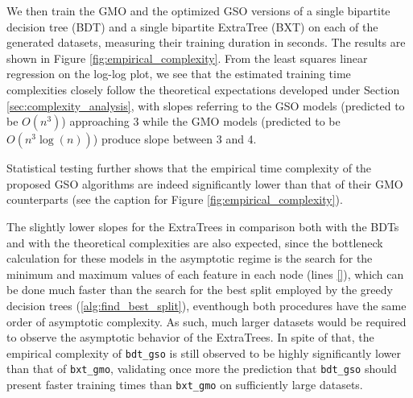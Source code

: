We then train the GMO and the optimized GSO versions of a single bipartite decision tree (BDT) and a single bipartite ExtraTree (BXT) on each of the generated datasets, measuring their training duration in seconds. The results are shown in Figure \ref{fig:empirical_complexity}. From the least squares linear regression on the log-log plot, we see that the estimated training time complexities closely follow the theoretical expectations developed under Section \ref{sec:complexity_analysis}, with slopes referring to the GSO models (predicted to be $O(n^3)$) approaching 3 while the GMO models (predicted to be $O(n^3\log(n))$) produce slope between 3 and 4.

Statistical testing further shows that the empirical time complexity of the proposed GSO algorithms are indeed significantly lower than that of their GMO counterparts (see the caption for Figure \ref{fig:empirical_complexity}).


The slightly lower slopes for the ExtraTrees in comparison both with the BDTs and with the theoretical complexities are also expected, since the bottleneck calculation for these models in the asymptotic regime is the search for the minimum and maximum values of each feature in each node (lines \ref{}), which can be done much faster than the search for the best split employed by the greedy decision trees (\autoref{alg:find_best_split}), eventhough both procedures have the same order of asymptotic complexity. As such, much larger datasets would be required to observe the asymptotic behavior of the ExtraTrees.
In spite of that, the empirical complexity of \texttt{bdt\_gso} is still observed to be highly significantly lower than that of \texttt{bxt\_gmo}, validating once more the prediction that \texttt{bdt\_gso} should present faster training times than \texttt{bxt\_gmo} on sufficiently large datasets.

